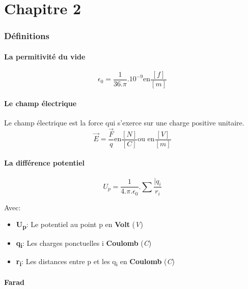 \part{Chapitre 2}
\section{Définitions}
 \subsection{La permitivité du vide}

 \begin{equation}
	 \epsilon_{0} = \frac{1}{36.\pi}.10^{-9} \text{en} \frac{[f]}{[m]}
 \end{equation}

 \subsection{Le champ électrique}
 Le champ électrique est la force qui s'exerce sur une charge positive unitaire.
 \begin{equation}
	 \overrightarrow{E} = \frac{\overrightarrow{F}}{q} \text{en} \frac{[N]}{[C]} \text{ou en}\frac{[V]}{[m]}
 \end{equation}

 \subsection{La différence potentiel}
 \begin{equation}
	 U_{p} = \frac{1}{4.\pi.\epsilon_{0}}.\sum\frac{|q_{i}}{r_{i}}
 \end{equation}

 Avec:
 \begin{itemize}
	 \item \textbf{U\textsubscript{p}}: Le potentiel au point p en \textbf{Volt} (\textit{V})
	 \item \textbf{q\textsubscript{i}}: Les charges ponctuelles i \textbf{Coulomb} (\textit{C})
	 \item \textbf{r\textsubscript{i}}: Les distances entre p et les q\textsubscript{i} en \textbf{Coulomb} (\textit{C})
 \end{itemize}

 \subsection{Farad}

